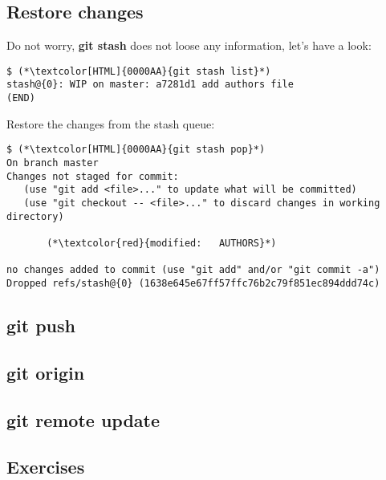 \subsection{Restore changes}
\begin{frame}[fragile]
\subslidetitle

Do not worry, \textbf{git stash} does not loose any information, let's have a look:

\begin{lstlisting}
$ (*\textcolor[HTML]{0000AA}{git stash list}*)
stash@{0}: WIP on master: a7281d1 add authors file
(END)
\end{lstlisting}

Restore the changes from the stash queue:

\begin{lstlisting}
$ (*\textcolor[HTML]{0000AA}{git stash pop}*)
On branch master
Changes not staged for commit:
   (use "git add <file>..." to update what will be committed)
   (use "git checkout -- <file>..." to discard changes in working directory)

       (*\textcolor{red}{modified:   AUTHORS}*)

no changes added to commit (use "git add" and/or "git commit -a")
Dropped refs/stash@{0} (1638e645e67ff57ffc76b2c79f851ec894ddd74c)
\end{lstlisting}
\end{frame}

\subsection{git push}
\begin{frame}[fragile]
    \subslidetitle
\end{frame}

\subsection{git origin}
\begin{frame}[fragile]
    \subslidetitle
\end{frame}

\subsection{git remote update}
\begin{frame}[fragile]
    \subslidetitle
\end{frame}

\subsection{Exercises}
\begin{frame}[fragile]
  \subslidetitle
\end{frame}
